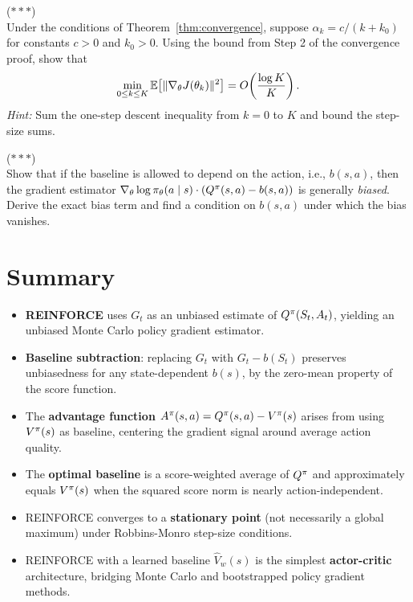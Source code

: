 \documentclass[11pt,a4paper]{article}
\begin{document}
\begin{exercise} \textnormal{(\(***\))} \\
  Under the conditions of Theorem~\ref{thm:convergence}, suppose
  $\alpha_k = c / (k + k_0)$ for constants $c > 0$ and $k_0 > 0$.
  Using the bound from Step 2 of the convergence proof, show that
  \[
    \min_{0 \leq k \leq K} \mathbb{E}\bigl[\|\nabla_\theta J(\theta_k)\|^2\bigr]
    = O\!\left(\frac{\log K}{K}\right).
  \]
  \textit{Hint:} Sum the one-step descent inequality from $k = 0$ to $K$
  and bound the step-size sums.
\end{exercise}

\begin{exercise} \textnormal{(\(***\))} \\
  Show that if the baseline is allowed to depend on the action, i.e.,
  $b(s, a)$, then the gradient estimator
  $\nabla_\theta \log \pi_\theta(a \mid s) \cdot (Q^\pi(s,a) -
  b(s,a))$ is generally \emph{biased}. Derive the exact bias term and
  find a condition on $b(s,a)$ under which the bias vanishes.
\end{exercise}

\section{Summary}

\begin{itemize}
  \item \textbf{REINFORCE} uses $G_t$ as an unbiased estimate of
    $Q^{\pi}(S_t, A_t)$, yielding an unbiased Monte Carlo policy gradient
    estimator.

  \item \textbf{Baseline subtraction}: replacing $G_t$ with
    $G_t - b(S_t)$ preserves unbiasedness for any state-dependent $b(s)$,
    by the zero-mean property of the score function.

  \item The \textbf{advantage function}
    $A^\pi(s,a) = Q^{\pi}(s,a) - V^{\pi}(s)$ arises from using $V^{\pi}(s)$
    as baseline, centering the gradient signal around average action quality.

  \item The \textbf{optimal baseline} is a score-weighted average of
    $Q^{\pi}$ and approximately equals $V^{\pi}(s)$ when the squared score norm
    is nearly action-independent.

  \item REINFORCE converges to a \textbf{stationary point} (not
    necessarily a global maximum) under Robbins-Monro step-size conditions.

  \item REINFORCE with a learned baseline $\hat{V}_w(s)$ is the simplest
    \textbf{actor-critic} architecture, bridging Monte Carlo and
    bootstrapped policy gradient methods.
\end{itemize}
\end{document}
